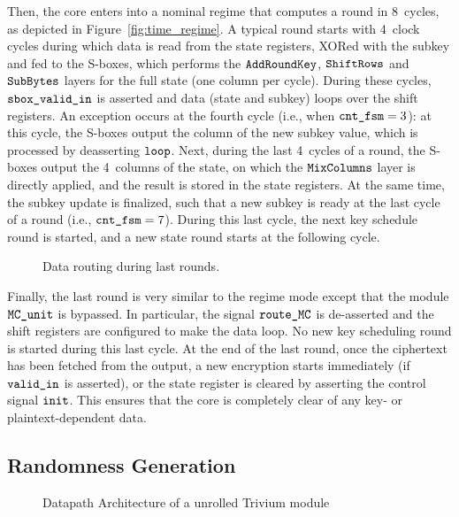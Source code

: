 \documentclass{scrartcl}
\begin{document}
Then, the core enters into a nominal regime that computes a round in 8~cycles,
as depicted in Figure~\ref{fig:time_regime}.  A typical round starts with
4~clock cycles during which data is read from the state registers, XORed with
the subkey and fed to the S-boxes, which performs the $\texttt{AddRoundKey}$, $\texttt{ShiftRows}$ and $\texttt{SubBytes}$
layers for the full state (one column per cycle).  During these cycles,
$\texttt{sbox\_valid\_in}$ is asserted and data (state and subkey) loops over the shift
registers. An exception occurs at the fourth cycle (i.e., when
$\texttt{cnt\_fsm}=3$): at this cycle, the S-boxes output the column of the new
subkey value, which is processed by deasserting $\texttt{loop}$.  Next, during
the last 4~cycles of a round, the S-boxes output the 4~columns of the state, on
which the $\texttt{MixColumns}$ layer is directly applied, and the result is stored in the
state registers. At the same time, the subkey update is finalized, such that a
new subkey is ready at the last cycle of a round (i.e., $\texttt{cnt\_fsm}=7$).
During this last cycle, the next key schedule round is started, and a new state
round starts at the following cycle.

\begin{figure}
    \centering
     
    \caption{Data routing during last rounds.}
    \label{fig:time_last_round}
\end{figure}

Finally, the last round is very similar to the regime mode except that the
module $\texttt{MC\_unit}$ is bypassed. In particular, the signal
$\texttt{route\_MC}$ is de-asserted and the shift registers are configured to
make the data loop. No new key scheduling round is started during this last
cycle.
At the end of the last round, once the ciphertext has been fetched from the
output, a new encryption starts immediately (if $\texttt{valid\_in}$ is asserted),
or the state register is cleared by asserting the control signal
$\texttt{init}$.
This ensures that the core is completely clear of any key- or
plaintext-dependent data.

\subsection{Randomness Generation} 


\begin{figure}
    \centering
    \resizebox{\textwidth}{!}{
        \begin{tikzpicture}
            
        \end{tikzpicture}
    }
    \caption{Datapath Architecture of a unrolled Trivium module}
    \label{fig:prng}
\end{figure}
\end{document}
